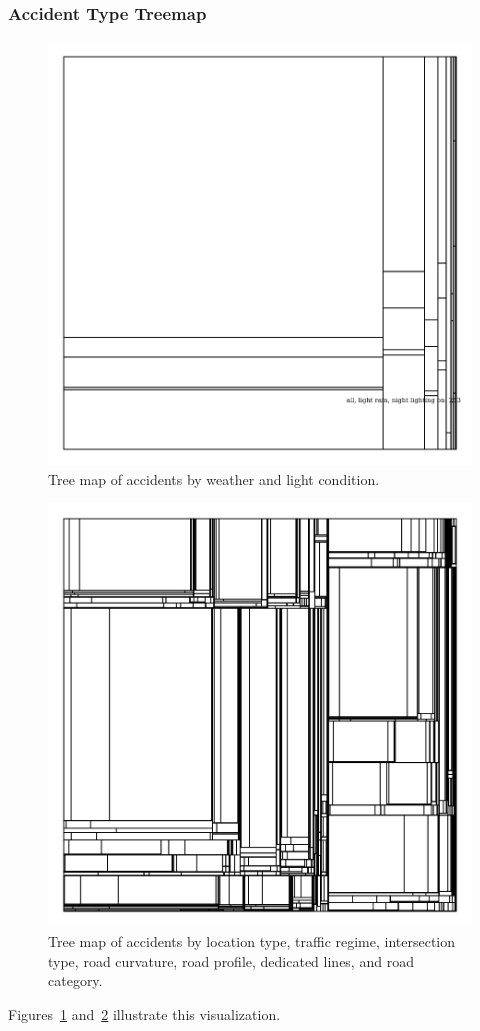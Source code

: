 \subsubsection{Accident Type Treemap}
\begin{figure}
    \centering
    \includegraphics[width=0.6\linewidth]{figures/tree-treemap-weather-light-condition.png}
    \caption{Tree map of accidents by weather and light condition.}
    \label{figure-treemap-weather-light-condition}
\end{figure}
\begin{figure}
    \centering
    \includegraphics[width=0.6\linewidth]{figures/tree-treemap-location-type-traffic-regime-intersection-type-road-curvature-road-profile-dedicated-line-road-category.png}
    \caption{Tree map of accidents by location type, traffic regime, intersection type, road curvature, road profile, dedicated lines, and road category.}
    \label{figure-treemap-many}
\end{figure}
Figures~\ref{figure-treemap-weather-light-condition} and~\ref{figure-treemap-many} illustrate this visualization.

